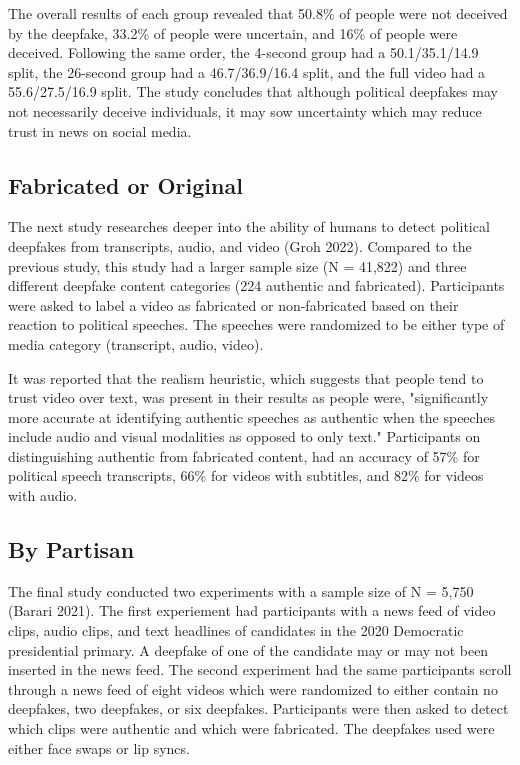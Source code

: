 \documentclass[
  journal=small,
  manuscript=article-type,  %
  year=2020,
  volume=37,
]{cup-journal}
\begin{document}
The overall results of each group revealed that 50.8\% of people were not deceived by the deepfake, 33.2\% of people were uncertain, and 16\% of people were deceived. Following the same order, the 4-second group had a 50.1/35.1/14.9 split, the 26-second group had a 46.7/36.9/16.4 split, and the full video had a 55.6/27.5/16.9 split. The study concludes that although political deepfakes may not necessarily deceive individuals, it may sow uncertainty which may reduce trust in news on social media. 

\subsection{Fabricated or Original}
The next study researches deeper into the ability of humans to detect political deepfakes from transcripts, audio, and video (Groh 2022). Compared to the previous study, this study had a larger sample size (N = 41,822) and three different deepfake content categories (224 authentic and fabricated). Participants were asked to label a video as fabricated or non-fabricated based on their reaction to political speeches. The speeches were randomized to be either type of media category (transcript, audio, video). 

It was reported that the realism heuristic, which suggests that people tend to trust video over text, was present in their results as people were, "significantly more accurate at identifying authentic speeches as authentic when the speeches include audio and visual modalities as opposed to only text." Participants on distinguishing authentic from fabricated content, had an accuracy of 57\% for political speech transcripts, 66\% for videos with subtitles, and 82\% for videos with audio.

\subsection{By Partisan}
The final study conducted two experiments with a sample size of N = 5,750 (Barari 2021). The first experiement had participants with a news feed of video clips, audio clips, and text headlines of candidates in the 2020 Democratic presidential primary. A deepfake of one of the candidate may or may not been inserted in the news feed. The second experiment had the same participants scroll through a news feed of eight videos which were randomized to either contain no deepfakes, two deepfakes, or six deepfakes. Participants were then asked to detect which clips were authentic and which were fabricated. The deepfakes used were either face swaps or lip syncs. 
\end{document}
